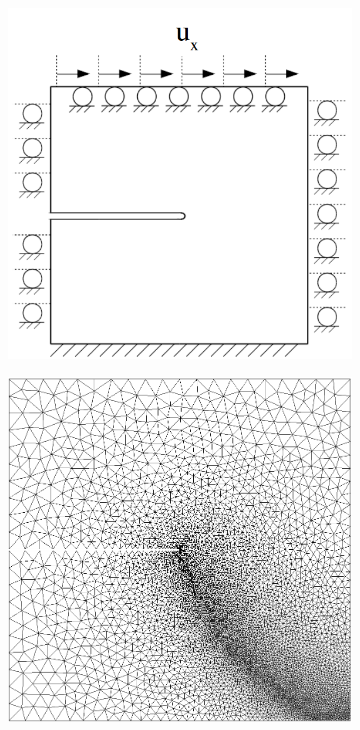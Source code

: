 \begin{figure}[htb!]
  \begin{subfigure}[b]{0.25\textwidth}
    \centering
    \includegraphics[width=\textwidth,scale=0.5]{Chapter4/figures/mode2_bcs.png}
    \caption{}
    \label{fig: Chapter4/mode2_bcs}
  \end{subfigure}
  \hspace{0.03\textwidth}
  \begin{subfigure}[b]{0.19\textwidth}
    \centering
    \includegraphics[width=\textwidth]{Chapter4/figures/mode2_notch_mesh.png}

\end{subfigure}
\end{figure}
